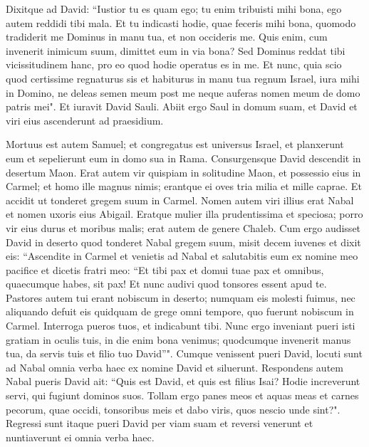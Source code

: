 \begin{biblechapter}
\verse Dixitque ad David: “Iustior tu es quam ego; tu enim tribuisti mihi bona, ego autem reddidi tibi mala. 
\verse Et tu indicasti hodie, quae feceris mihi bona, quomodo tradiderit me Dominus in manu tua, et non occideris me. 
\verse Quis enim, cum invenerit inimicum suum, dimittet eum in via bona? Sed Dominus reddat tibi vicissitudinem hanc, pro eo quod hodie operatus es in me. 
\verse Et nunc, quia scio quod certissime regnaturus sis et habiturus in manu tua regnum Israel, 
\verse iura mihi in Domino, ne deleas semen meum post me neque auferas nomen meum de domo patris mei". 
\verse Et iuravit David Sauli. Abiit ergo Saul in domum suam, et David et viri eius ascenderunt ad praesidium. 
\end{biblechapter}

\begin{biblechapter}  
\verse Mortuus est autem Samuel; et congregatus est universus Israel, et planxerunt eum et sepelierunt eum in domo sua in Rama. Consurgensque David descendit in desertum Maon. 
\verse Erat autem vir quispiam in solitudine Maon, et possessio eius in Carmel; et homo ille magnus nimis; erantque ei oves tria milia et mille caprae. Et accidit ut tonderet gregem suum in Carmel. 
\verse Nomen autem viri illius erat Nabal et nomen uxoris eius Abigail. Eratque mulier illa prudentissima et speciosa; porro vir eius durus et moribus malis; erat autem de genere Chaleb. 
\verse Cum ergo audisset David in deserto quod tonderet Nabal gregem suum, 
\verse misit decem iuvenes et dixit eis: “Ascendite in Carmel et venietis ad Nabal et salutabitis eum ex nomine meo pacifice 
\verse et dicetis fratri meo: “Et tibi pax et domui tuae pax et omnibus, quaecumque habes, sit pax! 
\verse Et nunc audivi quod tonsores essent apud te. Pastores autem tui erant nobiscum in deserto; numquam eis molesti fuimus, nec aliquando defuit eis quidquam de grege omni tempore, quo fuerunt nobiscum in Carmel. 
\verse Interroga pueros tuos, et indicabunt tibi. Nunc ergo inveniant pueri isti gratiam in oculis tuis, in die enim bona venimus; quodcumque invenerit manus tua, da servis tuis et filio tuo David”". 
\verse Cumque venissent pueri David, locuti sunt ad Nabal omnia verba haec ex nomine David et siluerunt. 
\verse Respondens autem Nabal pueris David ait: “Quis est David, et quis est filius Isai? Hodie increverunt servi, qui fugiunt dominos suos. 
\verse Tollam ergo panes meos et aquas meas et carnes pecorum, quae occidi, tonsoribus meis et dabo viris, quos nescio unde sint?". 
\verse Regressi sunt itaque pueri David per viam suam et reversi venerunt et nuntiaverunt ei omnia verba haec. 

\end{biblechapter}
